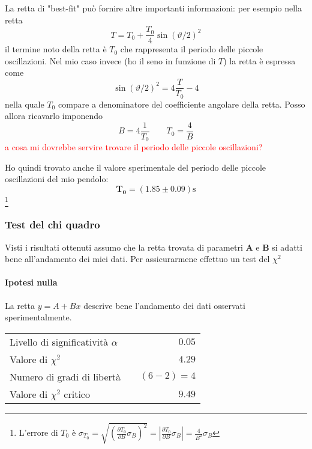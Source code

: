 \documentclass{article}
\begin{document}
\vspace{1.5cm}
\noindent
La retta di "best-fit" può fornire altre importanti informazioni: per esempio nella retta 
\[
T = T_0 + \frac{T_0}{4}\sin{\left(\vartheta/2\right)}^2
\]
il termine noto della retta è $T_0$ che rappresenta il periodo delle piccole oscillazioni. Nel mio caso invece (ho il seno in funzione di $T$) la retta è espressa come
\[
\sin{\left(\vartheta/2\right)}^2 = 4\frac{T}{T_0} - 4
\]
nella quale $T_0$ compare a denominatore del coefficiente angolare della retta. Posso allora ricavarlo imponendo
\[
B =  4\frac{1}{T_0} \qquad T_0 = \frac{4}{B} 
\]
\textcolor{red}{a cosa mi dovrebbe servire trovare il periodo delle piccole oscillazioni?}

\noindent
Ho quindi trovato anche il valore sperimentale del periodo delle piccole oscillazioni del mio pendolo:
\[
\mathbf{T_0} = (1.85 \pm 0.09)\text{s}
\]
\footnote{L'errore di $T_0$ è $\sigma_{T_0} = \sqrt{\left(\frac{\partial T_0}{\partial B}\sigma_{B}\right)^2} = \left|\frac{\partial T_0}{\partial B}\sigma_{B}\right| = \frac{4}{B^2}\sigma_B$}

\subsubsection{Test del chi quadro}
Visti i risultati ottenuti assumo che la retta trovata di parametri $\mathbf{A}$ e $\mathbf{B}$ si adatti bene all'andamento dei miei dati. Per assicurarmene effettuo un test del $\chi^2$

\paragraph{Ipotesi nulla} La retta $y = A + Bx$ descrive bene l'andamento dei dati osservati sperimentalmente.

\vspace{0.7cm}
\begin{table}[H]
	\centering
	\begin{tabular}{lr} 
		Livello di significatività $\alpha$		&$\quad 0.05$  \\
		Valore di $\chi ^2$             	& $\quad 4.29$       \\
		Numero di gradi di libertà      	& $\quad (6-2) = 4$         \\   
		Valore di $\chi ^2$ critico     	& $\quad 9.49$
	\end{tabular}
\end{table}
\vspace{0.7cm}
\end{document}
